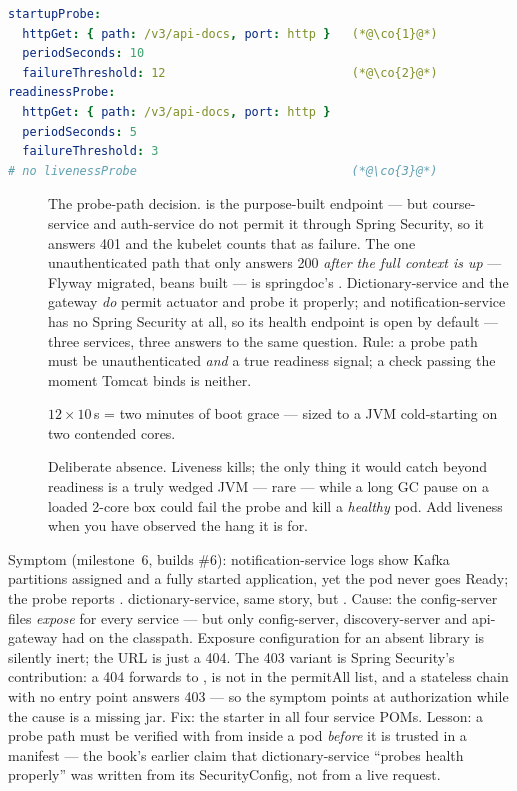 \begin{lstlisting}[language=yaml]
startupProbe:
  httpGet: { path: /v3/api-docs, port: http }   (*@\co{1}@*)
  periodSeconds: 10
  failureThreshold: 12                          (*@\co{2}@*)
readinessProbe:
  httpGet: { path: /v3/api-docs, port: http }
  periodSeconds: 5
  failureThreshold: 3
# no livenessProbe                              (*@\co{3}@*)
\end{lstlisting}

\begin{description}
  \item[] The probe-path decision.  is the
  purpose-built endpoint --- but course-service and auth-service do not
  permit it through Spring Security, so it answers 401 and the kubelet
  counts that as failure. The one unauthenticated path that only answers
  200 \emph{after the full context is up} --- Flyway migrated, beans
  built --- is springdoc's . Dictionary-service and
  the gateway \emph{do} permit actuator and probe it properly; and
  notification-service has no Spring Security at all, so its health
  endpoint is open by default --- three services, three answers to the
  same question. Rule:
  a probe path must be unauthenticated \emph{and} a true readiness
  signal; a  check passing the moment Tomcat binds is
  neither.
  \item[] $12 \times 10$\,s = two minutes of boot grace --- sized
  to a JVM cold-starting on two contended cores.
  \item[] Deliberate absence. Liveness kills; the only thing it
  would catch beyond readiness is a truly wedged JVM --- rare --- while a
  long GC pause on a loaded 2-core box could fail the probe and kill a
  \emph{healthy} pod. Add liveness when you have observed the hang it
  is for.
\end{description}

\begin{pitfall}
Symptom (milestone~6, builds \#6): notification-service logs show
Kafka partitions assigned and a fully started application, yet the
pod never goes Ready; the probe reports . dictionary-service,
same story, but . Cause: the config-server files
\emph{expose}  for every service
--- but only config-server, discovery-server and api-gateway had
 on the classpath. Exposure
configuration for an absent library is silently inert; the URL is
just a 404. The 403 variant is Spring Security's contribution: a 404
forwards to ,  is not in the permitAll list,
and a stateless chain with no entry point answers 403 --- so the
symptom points at authorization while the cause is a missing jar.
Fix: the starter in all four service POMs. Lesson: a probe path must
be verified with  from inside a pod \emph{before} it is
trusted in a manifest --- the book's earlier claim that
dictionary-service ``probes health properly'' was written from its
SecurityConfig, not from a live request.
\end{pitfall}

